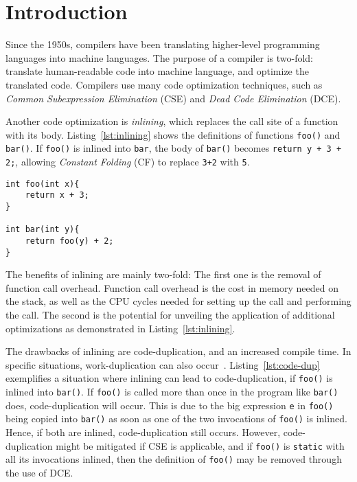 
\section{Introduction}
\label{introduction}

Since the 1950s, compilers have been translating higher-level programming
languages into machine languages. The purpose of a compiler is two-fold:
translate human-readable code into machine language, and optimize the translated
code. Compilers use many code optimization techniques, such as \textit{Common Subexpression Elimination} (CSE) and
\textit{Dead Code Elimination} (DCE).

Another code optimization is \textit{inlining}, which replaces the call site of
a function with its body. Listing~\ref{lst:inlining} shows the definitions of
functions \lstinline!foo()! and \lstinline!bar()!. If \lstinline!foo()! is
inlined into \lstinline!bar!, the body of \lstinline!bar()! becomes
\lstinline!return y + 3 + 2;!, allowing \textit{Constant Folding} (CF) to
replace \lstinline!3+2! with \lstinline!5!.

\begin{centering}
	\noindent\begin{minipage}{\textwidth}
		\begin{CenteredBox}
		\begin{lstlisting}[style=global_customcpp]
int foo(int x){
	return x + 3;
}

int bar(int y){
	return foo(y) + 2;
}
		\end{lstlisting}
		\end{CenteredBox}
	\end{minipage}
	\label{lst:inlining}
\end{centering}

The benefits of inlining are mainly two-fold: The first one is the removal of
function call overhead. Function call overhead is the cost in memory needed on
the stack, as well as the CPU cycles needed for setting up the call and
performing the call. The second is the potential for unveiling the application
of additional optimizations as demonstrated in Listing~\ref{lst:inlining}.

The drawbacks of inlining are code-duplication, and an increased compile time.
In specific situations, work-duplication can also occur~\cite{GHCPaper}.
Listing~\ref{lst:code-dup} exemplifies a situation where inlining can lead to
code-duplication, if \lstinline!foo()! is inlined into \lstinline!bar()!. If
\lstinline!foo()! is called more than once in the program like \lstinline!bar()!
does, code-duplication will occur. This is due to the big expression
\lstinline!e! in \lstinline!foo()! being copied into \lstinline!bar()! as soon
as one of the two invocations of \lstinline!foo()! is inlined. Hence, if both
are inlined, code-duplication still occurs. However, code-duplication might be
mitigated if CSE is applicable, and if \lstinline!foo()! is \lstinline!static!
with all its invocations inlined, then the definition of \lstinline!foo()! may
be removed through the use of DCE.

